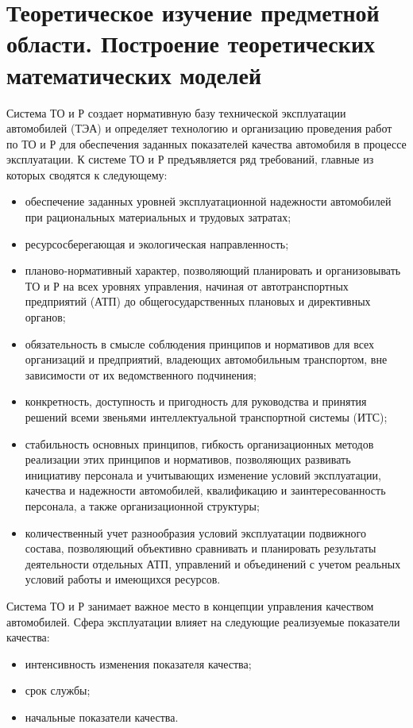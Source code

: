 \documentclass[../nirs.tex]{subfiles}
\begin{document}
\section{Теоретическое изучение предметной области. Построение теоретических
математических моделей}

Система ТО и Р создает нормативную базу технической эксплуатации автомобилей
(ТЭА) и определяет технологию и организацию проведения работ по ТО и Р для
обеспечения заданных показателей качества автомобиля в процессе эксплуатации. К
системе ТО и Р предъявляется ряд требований, главные из которых сводятся к
следующему:
\begin{itemize}
    \item обеспечение заданных уровней эксплуатационной надежности автомобилей
        при рациональных материальных и трудовых затратах;
    \item ресурсосберегающая и экологическая направленность;
    \item планово-нормативный характер, позволяющий планировать и организовывать
        ТО и Р на всех уровнях управления, начиная от автотранспортных
        предприятий (АТП) до общегосударственных плановых и директивных органов;
    \item обязательность в смысле соблюдения принципов и нормативов для всех
        организаций и предприятий, владеющих автомобильным транспортом, вне
        зависимости от их ведомственного подчинения;
    \item конкретность, доступность и пригодность для руководства и принятия
        решений всеми звеньями интеллектуальной транспортной системы (ИТС);
    \item стабильность основных принципов, гибкость организационных методов
        реализации этих принципов и нормативов, позволяющих развивать инициативу
        персонала и учитывающих изменение условий эксплуатации, качества и
        надежности автомобилей, квалификацию и заинтересованность персонала, а
        также организационной структуры;
    \item количественный учет разнообразия условий эксплуатации подвижного
        состава, позволяющий объективно сравнивать и планировать результаты
        деятельности отдельных АТП, управлений и объединений с учетом реальных
        условий работы и имеющихся ресурсов.
\end{itemize}

Система ТО и Р занимает важное место в концепции управления качеством
автомобилей. Сфера эксплуатации влияет на следующие реализуемые показатели
качества:
\begin{itemize}
    \item интенсивность изменения показателя качества;
    \item срок службы;
    \item начальные показатели качества.
\end{itemize}
\end{document}
